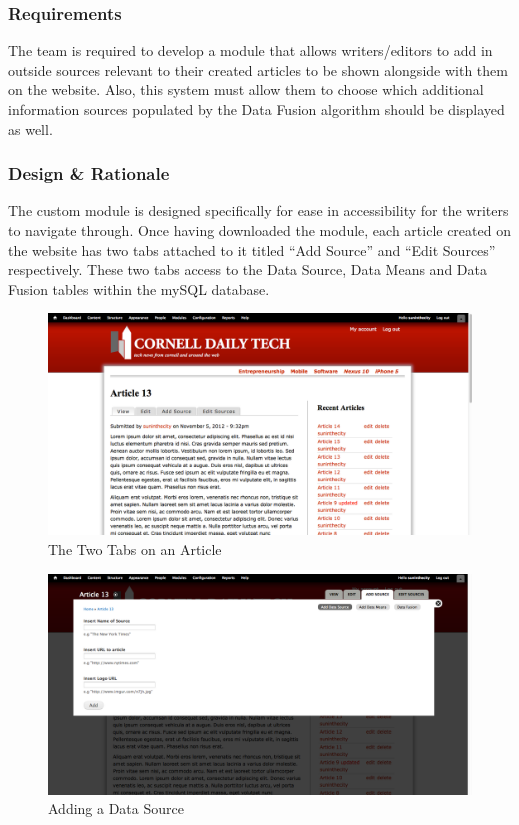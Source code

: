 \documentclass[12pt]{article} %
\begin{document}
\subsubsection{Requirements}

The team is required to develop a module that allows writers/editors to add in outside sources relevant to their created articles to be shown alongside with them on the website. Also, this system must allow them to choose which additional information sources populated by the Data Fusion algorithm should be displayed as well.

\subsubsection{Design \& Rationale}

The custom module is designed specifically for ease in accessibility for the writers to navigate through. Once having downloaded the module, each article created on the website has two tabs attached to it titled “Add Source” and “Edit Sources” respectively. These two tabs access to the Data Source, Data Means and Data Fusion tables within the mySQL database.

\begin{figure}[htbp]
\begin{center}
\includegraphics[width=6in]{images/twoTabs}
\caption{The Two Tabs on an Article}
\end{center}
\end{figure}

\begin{figure}[htbp]
\begin{center}
\includegraphics[width=6in]{images/addDataSource}
\caption{Adding a Data Source}
\end{center}
\end{figure}
\end{document}
